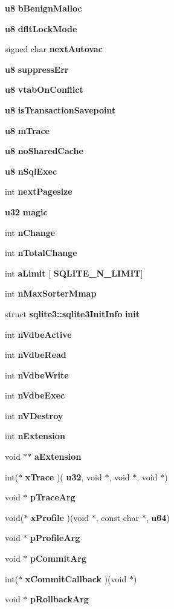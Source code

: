 \begin{DoxyCompactItemize}
\textbf{ u8} \textbf{ b\+Benign\+Malloc}
\item 
\textbf{ u8} \textbf{ dflt\+Lock\+Mode}
\item 
signed char \textbf{ next\+Autovac}
\item 
\textbf{ u8} \textbf{ suppress\+Err}
\item 
\textbf{ u8} \textbf{ vtab\+On\+Conflict}
\item 
\textbf{ u8} \textbf{ is\+Transaction\+Savepoint}
\item 
\textbf{ u8} \textbf{ m\+Trace}
\item 
\textbf{ u8} \textbf{ no\+Shared\+Cache}
\item 
\textbf{ u8} \textbf{ n\+Sql\+Exec}
\item 
int \textbf{ next\+Pagesize}
\item 
\textbf{ u32} \textbf{ magic}
\item 
int \textbf{ n\+Change}
\item 
int \textbf{ n\+Total\+Change}
\item 
int \textbf{ a\+Limit} [\textbf{ S\+Q\+L\+I\+T\+E\+\_\+\+N\+\_\+\+L\+I\+M\+IT}]
\item 
int \textbf{ n\+Max\+Sorter\+Mmap}
\item 
struct \textbf{ sqlite3\+::sqlite3\+Init\+Info} \textbf{ init}
\item 
int \textbf{ n\+Vdbe\+Active}
\item 
int \textbf{ n\+Vdbe\+Read}
\item 
int \textbf{ n\+Vdbe\+Write}
\item 
int \textbf{ n\+Vdbe\+Exec}
\item 
int \textbf{ n\+V\+Destroy}
\item 
int \textbf{ n\+Extension}
\item 
void $\ast$$\ast$ \textbf{ a\+Extension}
\item 
int($\ast$ \textbf{ x\+Trace} )(\textbf{ u32}, void $\ast$, void $\ast$, void $\ast$)
\item 
void $\ast$ \textbf{ p\+Trace\+Arg}
\item 
void($\ast$ \textbf{ x\+Profile} )(void $\ast$, const char $\ast$, \textbf{ u64})
\item 
void $\ast$ \textbf{ p\+Profile\+Arg}
\item 
void $\ast$ \textbf{ p\+Commit\+Arg}
\item 
int($\ast$ \textbf{ x\+Commit\+Callback} )(void $\ast$)
\item 
void $\ast$ \textbf{ p\+Rollback\+Arg}
\item 
$$
\end{DoxyCompactItemize}
